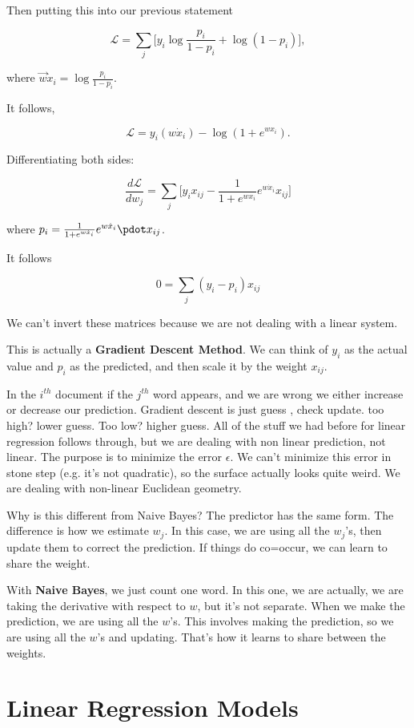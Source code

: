 Then putting this into our previous statement

$$\mathcal{L} = \sum_j \Bigg[ y_i \log\frac{p_i}{1 - p_i} + \log(1 - p_i)\Bigg],$$

where $\vec{w} \dot x_i = \log\frac{p_i}{1 - p_i}$.

It follows, 

$$\mathcal{L} = y_i ( w \dot x_i ) - \log(1 + e^{w x_i }).$$

Differentiating both sides:

$$\frac{d \mathcal{L}}{d w_j} = \sum_j \Bigg[ y_i x_{ij} - \frac{1}{1 + e^{w  x_i}} e^{w \dot x_i} x_{ij} \Bigg]$$

where $p_i = \frac{1}{1 + e^{w \dot x_i}} e^{w \dot x_i} \pdot x_{ij}$. 

It follows

$$0 = \sum_j (y_i - p_i) x_{ij}$$

We can't invert these matrices because we are not dealing with a linear system. 

This is actually a \textbf{Gradient Descent Method}. We can think of $y_i$ as the actual value and $p_i$ as the predicted, and then scale it by the weight $x_{ij}$.

In the $i^{th}$ document if the $j^{th}$ word appears, and we are wrong we either increase or decrease our prediction. Gradient descent is just guess , check update. too high? lower guess. Too low? higher guess. All of the stuff we had before for linear regression follows through, but we are dealing with non linear prediction, not linear. The purpose is to minimize the error $\epsilon$. We can't minimize this error in stone step (e.g. it's not quadratic), so the surface actually looks quite weird. We are dealing with non-linear Euclidean geometry. 

Why is this different from Naive Bayes? The predictor has the same form. The difference is how we estimate $w_j$. In this case, we are using all the $w_j$'s, then update them to correct the prediction. If things do co=occur, we can learn to share the weight. 

With \textbf{Naive Bayes}, we just count one word. In this one, we are actually, we are taking the derivative with respect to $w$, but it's not separate. When we make the prediction, we are using all the $w$'s. This involves making the prediction, so we are using all the $w$'s and updating. That's how it learns to share between the weights.

\section{Linear Regression Models}

